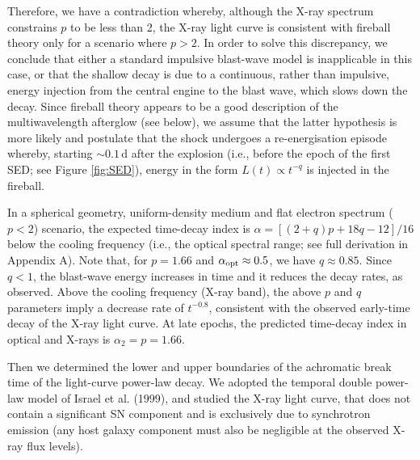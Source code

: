 \documentclass[fleqn,usenatbib]{mnras}
\begin{document}
Therefore, we have a contradiction whereby, although the X-ray spectrum constrains $p$ to be less than 2, the X-ray 
light curve is consistent with fireball theory only for a scenario where $p > 2$.  In order to solve this discrepancy, we conclude that either  a standard impulsive blast-wave model is inapplicable in this case, or that the shallow decay is  due to a continuous, rather than impulsive, energy injection from the central engine  to the blast wave, which slows down the decay.
Since  fireball theory appears to be  a good description of the multiwavelength afterglow (see below), we assume that the latter hypothesis is more likely and postulate that the shock undergoes a re-energisation  episode whereby, starting  $\sim 0.1$\,d after the explosion (i.e., before the epoch  of the first SED; see Figure \ref{fig:SED}), energy in the form $L(t) \propto t^{-q}$  is injected in  the fireball.

In a spherical geometry, uniform-density medium and flat electron
spectrum ($p < 2$) scenario, the expected time-decay index is $\alpha  = [(2 + q)p + 18q - 12]/16$  below the cooling frequency
(i.e., the optical spectral range; see full derivation in Appendix A). Note that,   for $p = 1.66$  and 
$\alpha_{\rm opt} \approx 0.5$, we have $q \approx 0.85$.  Since $q < 1$, the blast-wave energy increases 
in time and it reduces the decay rates, as observed. Above the cooling frequency (X-ray band), 
the above $p$ and $q$ parameters imply a decrease rate of $t^{-0.8}$, consistent with the observed 
early-time decay of the X-ray light curve.  At late epochs, the predicted time-decay index in optical and X-rays is $\alpha_2 = p = 1.66.$

Then we determined the lower and upper boundaries of the achromatic break time of the light-curve power-law decay.    We adopted the temporal double power-law model of Israel et al. (1999), and studied the X-ray light curve, that does not contain a significant SN component and is exclusively due to synchrotron emission (any host galaxy component must also be negligible at the observed X-ray flux levels).  
\end{document}
